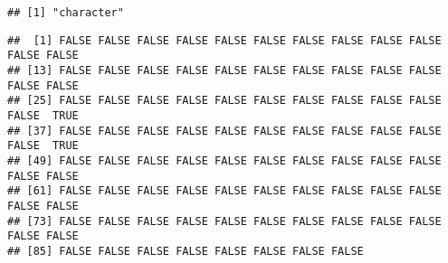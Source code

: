 \documentclass[
]{article}
\newenvironment{Shaded}{\begin{snugshade}}{\end{snugshade}}
\newcommand{\AttributeTok}[1]{\textcolor[rgb]{0.13,0.29,0.53}{#1}}
\newcommand{\CommentTok}[1]{\textcolor[rgb]{0.56,0.35,0.01}{\textit{#1}}}
\newcommand{\DecValTok}[1]{\textcolor[rgb]{0.00,0.00,0.81}{#1}}
\newcommand{\FunctionTok}[1]{\textcolor[rgb]{0.13,0.29,0.53}{\textbf{#1}}}
\newcommand{\NormalTok}[1]{#1}
\newcommand{\OtherTok}[1]{\textcolor[rgb]{0.56,0.35,0.01}{#1}}
\newcommand{\SpecialCharTok}[1]{\textcolor[rgb]{0.81,0.36,0.00}{\textbf{#1}}}
\newcommand{\StringTok}[1]{\textcolor[rgb]{0.31,0.60,0.02}{#1}}
\begin{document}
\begin{Shaded}
\end{Shaded}

\begin{verbatim}
## [1] "character"
\end{verbatim}

\begin{Shaded}
\end{Shaded}

\begin{verbatim}
##  [1] FALSE FALSE FALSE FALSE FALSE FALSE FALSE FALSE FALSE FALSE FALSE FALSE
## [13] FALSE FALSE FALSE FALSE FALSE FALSE FALSE FALSE FALSE FALSE FALSE FALSE
## [25] FALSE FALSE FALSE FALSE FALSE FALSE FALSE FALSE FALSE FALSE FALSE  TRUE
## [37] FALSE FALSE FALSE FALSE FALSE FALSE FALSE FALSE FALSE FALSE FALSE  TRUE
## [49] FALSE FALSE FALSE FALSE FALSE FALSE FALSE FALSE FALSE FALSE FALSE FALSE
## [61] FALSE FALSE FALSE FALSE FALSE FALSE FALSE FALSE FALSE FALSE FALSE FALSE
## [73] FALSE FALSE FALSE FALSE FALSE FALSE FALSE FALSE FALSE FALSE FALSE FALSE
## [85] FALSE FALSE FALSE FALSE FALSE FALSE FALSE FALSE
\end{verbatim}
\end{document}

